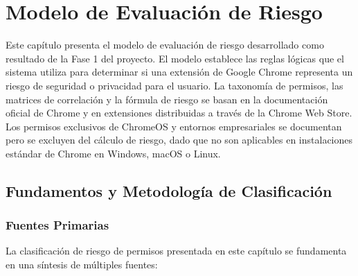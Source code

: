 \documentclass[12pt,oneside]{report}
\begin{document}
\chapter{Modelo de Evaluación de Riesgo}
\label{chap:modelo_riesgo}

\begingroup
\setlength{\parindent}{0pt}
\setlength{\parskip}{0.6em}

Este capítulo presenta el modelo de evaluación de riesgo desarrollado como resultado de la Fase 1 del proyecto. El modelo establece las reglas lógicas que el sistema utiliza para determinar si una extensión de Google Chrome representa un riesgo de seguridad o privacidad para el usuario. La taxonomía de permisos, las matrices de correlación y la fórmula de riesgo se basan en la documentación oficial de Chrome y en extensiones distribuidas a través de la Chrome Web Store. Los permisos exclusivos de ChromeOS y entornos empresariales se documentan pero se excluyen del cálculo de riesgo, dado que no son aplicables en instalaciones estándar de Chrome en Windows, macOS o Linux.

\section{Fundamentos y Metodología de Clasificación}

\subsection{Fuentes Primarias}

La clasificación de riesgo de permisos presentada en este capítulo se fundamenta en una síntesis de múltiples fuentes:
\end{document}
